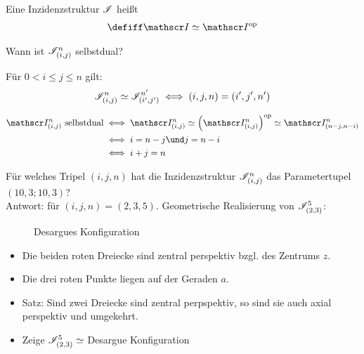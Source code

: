 \begin{definition}
	Eine Inzidenzstruktur $\mathscr{I}$ heißt 
	\begin{align*}
		\defiff\Inz\simeq\Inz^\op
	\end{align*}
\end{definition}

Wann ist $\mathscr{I}_{(i,j)}^n$ selbstdual?

\begin{lemma}
	Für $0<i\leq j\leq n$ gilt:
	\begin{align*}
		\mathscr{I}_{(i,j)}^n\simeq\mathscr{I}_{(i',j')}^{n'}\iff
		(i,j,n)=(i',j',n')
	\end{align*}
\end{lemma}

\begin{satz}
	\begin{align*}
		\Inz_{(i,j)}^n\text{ selbstdual}
		&\iff \Inz_{(i,j)}^n\simeq\Big(\Inz_{(i,j)}^n\Big)^\op\simeq \Inz_{(n-j,n-i)}^n\\
		&\iff i=n-j\und j=n-i\\
		&\iff i+j=n
	\end{align*}
\end{satz}

\begin{beispiel}
	Für welches Tripel $(i,j,n)$ hat die Inzidenzstruktur $\mathscr{I}_{(i,j)}^n$ das Parametertupel $(10,3;10,3)$?\\
	Antwort: für $(i,j,n)=(2,3,5)$.
	Geometrische Realisierung von $\mathscr{I}_{(2,3)}^5$:
	\begin{figure}[H] %
		\begin{center}
			
			\caption{Desargues Konfiguration}
		\end{center}
	\end{figure}
	\begin{itemize}
		\item Die beiden roten Dreiecke sind zentral perspektiv bzgl. des Zentrums $z$.
		\item Die drei roten Punkte liegen auf der Geraden $a$.
		\item Satz: Sind zwei Dreiecke sind zentral perpspektiv, so sind sie auch axial perspektiv und umgekehrt.
		\item Zeige $\mathscr{I}_{(2,3)}^5\simeq$ Desargue Konfiguration
	\end{itemize}
\end{beispiel}


